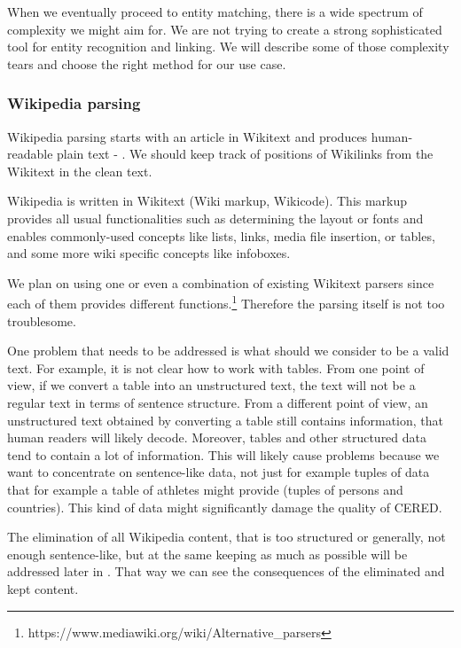 When we eventually proceed to entity matching, there is a wide spectrum of complexity we might aim for. We are not trying to create a strong sophisticated tool for entity recognition and linking. We will describe some of those complexity tears and choose the right method for our use case.



 

\subsubsection{Wikipedia parsing}

Wikipedia parsing starts with an article in Wikitext and produces human-readable plain text - . We should keep track of positions of Wikilinks from the Wikitext in the clean text.

Wikipedia is written in Wikitext (Wiki markup, Wikicode). This markup provides all usual functionalities such as determining the layout or fonts and enables commonly-used concepts like lists, links, media file insertion, or tables, and some more wiki specific concepts like infoboxes.

We plan on using one or even a combination of existing Wikitext parsers since each of them provides different functions.\footnote{https://www.mediawiki.org/wiki/Alternative\_parsers} Therefore the parsing itself is not too troublesome. 

One problem that needs to be addressed is what should we consider to be a valid text. For example, it is not clear how to work with tables. From one point of view, if we convert a table into an unstructured text, the text will not be a regular text in terms of sentence structure. From a different point of view, an unstructured text obtained by converting a table still contains information, that human readers will likely decode. Moreover, tables and other structured data tend to contain a lot of information. This will likely cause problems because we want to concentrate on sentence-like data, not just for example tuples of data that for example a table of athletes might provide (tuples of persons and countries). This kind of data might significantly damage the quality of CERED.

The elimination of all Wikipedia content, that is too structured or generally, not enough sentence-like, but at the same keeping as much as possible will be addressed later in . That way we can see the consequences of the eliminated and kept content.


